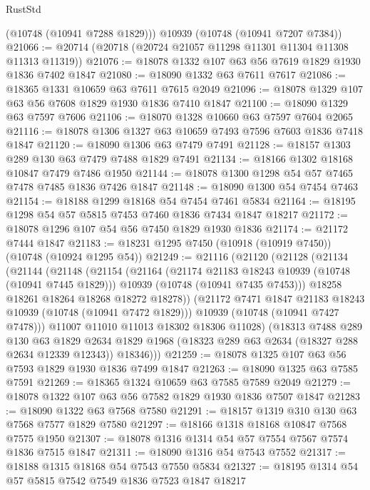 \begin{lexlean}{RustStd}
\begin{coremodule}
      (@10748 (@10941 @7288 @1829)))
    @10939
    (@10748 (@10941 @7207 @7384))
@21066 := @20714 (@20718 (@20724 @21057 @11298 @11301 @11304 @11308 @11313 @11319))
@21076 := @18078 @1332 @107 @63 @56 @7619 @1829 @1930 @1836 @7402 @1847
@21080 := @18090 @1332 @63 @7611 @7617
@21086 := @18365 @1331 @10659 @63 @7611 @7615 @2049
@21096 := @18078 @1329 @107 @63 @56 @7608 @1829 @1930 @1836 @7410 @1847
@21100 := @18090 @1329 @63 @7597 @7606
@21106 := @18070 @1328 @10660 @63 @7597 @7604 @2065
@21116 := @18078 @1306 @1327 @63 @10659 @7493 @7596 @7603 @1836 @7418 @1847
@21120 := @18090 @1306 @63 @7479 @7491
@21128 := @18157 @1303 @289 @130 @63 @7479 @7488 @1829 @7491
@21134 := @18166 @1302 @18168 @10847 @7479 @7486 @1950
@21144 := @18078 @1300 @1298 @54 @57 @7465 @7478 @7485 @1836 @7426 @1847
@21148 := @18090 @1300 @54 @7454 @7463
@21154 := @18188 @1299 @18168 @54 @7454 @7461 @5834
@21164 := @18195 @1298 @54 @57 @5815 @7453 @7460 @1836 @7434 @1847 @18217
@21172 := @18078 @1296 @107 @54 @56 @7450 @1829 @1930 @1836
@21174 := @21172 @7444 @1847
@21183 := @18231 @1295 @7450 (@10918 (@10919 @7450)) (@10748 (@10924 @1295 @54))
@21249 := @21116
    (@21120
      (@21128
        (@21134
          (@21144
            (@21148
              (@21154
                (@21164
                  (@21174 @21183 @18243 @10939 (@10748 (@10941 @7445 @1829)))
                  @10939
                  (@10748 (@10941 @7435 @7453)))
                @18258
                @18261
                @18264
                @18268
                @18272
                @18278))
            (@21172 @7471 @1847 @21183 @18243 @10939 (@10748 (@10941 @7472 @1829)))
            @10939
            (@10748 (@10941 @7427 @7478)))
          @11007
          @11010
          @11013
          @18302
          @18306
          @11028)
        (@18313
          @7488
          @289
          @130
          @63
          @1829
          @2634
          @1829
          @1968
          (@18323 @289 @63 @2634 (@18327 @288 @2634 @12339 @12343))
          @18346)))
@21259 := @18078 @1325 @107 @63 @56 @7593 @1829 @1930 @1836 @7499 @1847
@21263 := @18090 @1325 @63 @7585 @7591
@21269 := @18365 @1324 @10659 @63 @7585 @7589 @2049
@21279 := @18078 @1322 @107 @63 @56 @7582 @1829 @1930 @1836 @7507 @1847
@21283 := @18090 @1322 @63 @7568 @7580
@21291 := @18157 @1319 @310 @130 @63 @7568 @7577 @1829 @7580
@21297 := @18166 @1318 @18168 @10847 @7568 @7575 @1950
@21307 := @18078 @1316 @1314 @54 @57 @7554 @7567 @7574 @1836 @7515 @1847
@21311 := @18090 @1316 @54 @7543 @7552
@21317 := @18188 @1315 @18168 @54 @7543 @7550 @5834
@21327 := @18195 @1314 @54 @57 @5815 @7542 @7549 @1836 @7523 @1847 @18217

\end{coremodule}
\end{lexlean}

